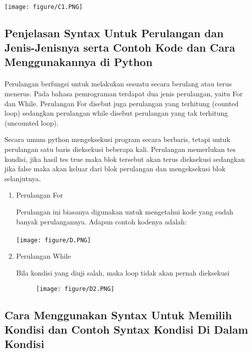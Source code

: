\documentclass{article}
\begin{document}
\paragraph{}
    \centerline{\texttt{[image: figure/C1.PNG]}}
    
\subsection{Penjelasan Syntax Untuk Perulangan dan Jenis-Jenisnya serta Contoh Kode dan Cara Menggunakannya di Python}
\paragraph{}
            Perulangan berfungsi untuk melakukan sesuatu secara berulang atau terus menerus. Pada bahasa pemrograman terdapat dua jenis perulangan, yaitu For dan While. Perulangan For disebut juga perulangan yang terhitung (counted loop) sedangkan perulangan while disebut perulangan yang tak terhitung (uncounted loop).
            \par
            Secara umum python mengeksekusi program secara berbaris, tetapi untuk perulangan satu baris dieksekusi beberapa kali. Perulangan memerlukan tes kondisi, jika hasil tes true maka blok tersebut akan terus dieksekusi sedangkan jika false maka akan keluar dari blok perulangan dan mengeksekusi blok selanjutnya.
\begin{enumerate}
    \item Perulangan For
    \par Perulangan ini biasanya digunakan untuk mengetahui kode yang sudah banyak perulangannya. Adapun contoh kodenya adalah:
    \paragraph{}
    \centerline{\texttt{[image: figure/D.PNG]}}
    \item Perulangan While
    \par Bila kondisi yang diuji salah, maka loop tidak akan pernah dieksekusi
    \begin{figure}[h]
    \centerline{\texttt{[image: figure/D2.PNG]}}
        \end{figure}
    
\end{enumerate}

\subsection{Cara Menggunakan Syntax Untuk Memilih Kondisi dan Contoh Syntax Kondisi Di Dalam Kondisi}
\end{document}
